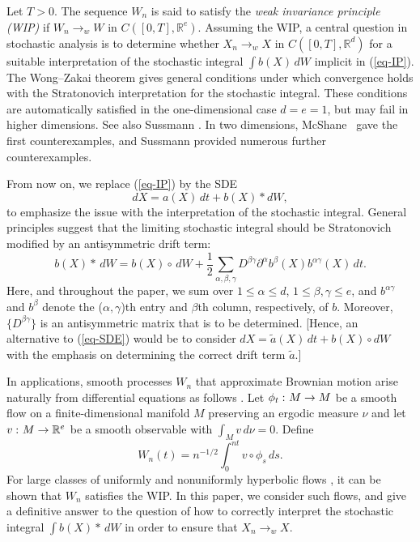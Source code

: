 \documentclass[aop,MSNbibl,seceqn,dvips]{arximspdf}
\newcommand{\eqref}[1]{(\ref{#1})}
\newcommand{\R}{\mathbb{R}}
\begin{document}
Let $T>0$. The sequence $W_n$ is said to satisfy the \emph{weak
invariance principle (WIP)}
if $W_n\to_w W$ in $C([0,T],\R^e)$. Assuming the WIP, a central
question in stochastic analysis is to determine whether $X_n\to_w X$ in
$C([0,T],\R^d)$ for a suitable interpretation of the stochastic
integral $\int b(X) \,dW$ implicit in \eqref{eq-IP}.
The Wong--Zakai theorem \cite{WongZakai65} gives general conditions
under which convergence holds with the Stratonovich interpretation for
the stochastic integral.
These conditions are automatically satisfied in the one-dimensional
case $d=e=1$, but may fail in higher dimensions. See also Sussmann
\cite
{Sussmann78}.
In two dimensions, McShane~\cite{McShane72} gave the first counterexamples,
and Sussmann \cite{Sussmann91} provided numerous further counterexamples.

From now on, we replace \eqref{eq-IP} by the SDE
%
\begin{equation}
\label{eq-SDE} dX=a(X) \,dt+b(X)\ast dW,
\end{equation}
%
to emphasize the issue with the interpretation of the stochastic integral.
General principles suggest that the limiting stochastic integral should
be Stratonovich modified by an antisymmetric drift term:
%
\[
b(X)\ast \,dW=b(X)\circ \,dW+\frac{1}2\sum_{\alpha,\beta,\gamma}D^{\beta
\gamma}
\partial^\alpha b^{\beta}(X) b^{ \alpha\gamma}(X) \,dt.
\]
%
Here, and throughout the paper, we sum over $1\le\alpha\le d$, $1\le
\beta,\gamma\le e$, and $b^{\alpha\gamma}$ and $b^\beta$ denote
the ($\alpha,\gamma$)th entry and
$\beta$th column, respectively, of $b$. Moreover, $\{D^{\beta\gamma
}\}
$ is an antisymmetric
matrix that is to be determined.
[Hence, an alternative to \eqref{eq-SDE} would be to consider
$dX=\tilde a(X) \,dt+b(X)\circ dW$ with the emphasis on determining the
correct drift term $\tilde a$.]

In applications, smooth processes $W_n$ that approximate Brownian
motion arise naturally from differential equations as
follows \cite
{GivonKupfermanStuart04,Huisinga03,MS11,Papanicolaou74,PavliotisStuart}.
Let $\phi_t\dvtx M\to M$ be a smooth flow on a finite-dimensional manifold
$M$ preserving an ergodic measure $\nu$ and
let $v\dvtx M\to\R^e$ be a smooth observable with $\int_M v \,d\nu=0$.
Define
%
\begin{equation}
\label{eq-W} W_n(t)=n^{-1/2}\int_0^{nt}
v\circ\phi_s \,ds.
\end{equation}
%
For large classes of uniformly and nonuniformly hyperbolic flows \mbox{\cite
{DenkerPhilipp84,MN05,MN09,Gouezel10}}, it can be shown that $W_n$
satisfies the WIP.
In this paper, we consider such flows, and give a definitive answer to
the question of how to correctly interpret the stochastic integral
$\int b(X)\ast \,dW$ in order to ensure that $X_n\to_w X$.
\end{document}
